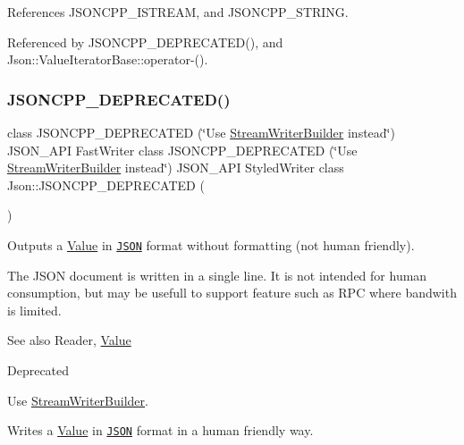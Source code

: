 References J\+S\+O\+N\+C\+P\+P\+\_\+\+I\+S\+T\+R\+E\+AM, and J\+S\+O\+N\+C\+P\+P\+\_\+\+S\+T\+R\+I\+NG.



Referenced by J\+S\+O\+N\+C\+P\+P\+\_\+\+D\+E\+P\+R\+E\+C\+A\+T\+E\+D(), and Json\+::\+Value\+Iterator\+Base\+::operator-\/().

\mbox{\label{namespaceJson_a9013c5f4f4ff260225b101a18af45262_a9013c5f4f4ff260225b101a18af45262}} 
\subsubsection{\texorpdfstring{J\+S\+O\+N\+C\+P\+P\+\_\+\+D\+E\+P\+R\+E\+C\+A\+T\+E\+D()}{JSONCPP\_DEPRECATED()}\hspace{0.1cm}{\footnotesize\ttfamily [2/3]}}
{\footnotesize\ttfamily class J\+S\+O\+N\+C\+P\+P\+\_\+\+D\+E\+P\+R\+E\+C\+A\+T\+ED (\char`\"{}Use \hyperlink{classJson_1_1StreamWriterBuilder}{Stream\+Writer\+Builder} instead\char`\"{}) J\+S\+O\+N\+\_\+\+A\+PI Fast\+Writer class J\+S\+O\+N\+C\+P\+P\+\_\+\+D\+E\+P\+R\+E\+C\+A\+T\+ED (\char`\"{}Use \hyperlink{classJson_1_1StreamWriterBuilder}{Stream\+Writer\+Builder} instead\char`\"{}) J\+S\+O\+N\+\_\+\+A\+PI Styled\+Writer class Json\+::\+J\+S\+O\+N\+C\+P\+P\+\_\+\+D\+E\+P\+R\+E\+C\+A\+T\+ED (\begin{DoxyParamCaption}\item[{\char`\"{}Use \hyperlink{classJson_1_1StreamWriterBuilder}{Stream\+Writer\+Builder} instead\char`\"{}}]{ }\end{DoxyParamCaption})}



Outputs a \hyperlink{classJson_1_1Value}{Value} in \href{http://www.json.org}{\tt J\+S\+ON} format without formatting (not human friendly). 

The J\+S\+ON document is written in a single line. It is not intended for \textquotesingle{}human\textquotesingle{} consumption, but may be usefull to support feature such as R\+PC where bandwith is limited. \begin{DoxySeeAlso}{See also}
Reader, \hyperlink{classJson_1_1Value}{Value} 
\end{DoxySeeAlso}
\begin{DoxyRefDesc}{Deprecated}
\item[\hyperlink{deprecated__deprecated000008}{Deprecated}]Use \hyperlink{classJson_1_1StreamWriterBuilder}{Stream\+Writer\+Builder}. \end{DoxyRefDesc}
Writes a \hyperlink{classJson_1_1Value}{Value} in \href{http://www.json.org}{\tt J\+S\+ON} format in a human friendly way.

